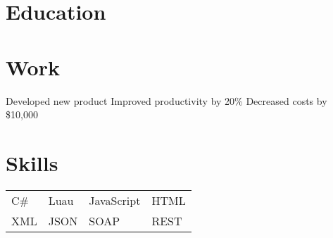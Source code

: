 \documentclass{my_cv}
\begin{document}

\section{Education}

\section{Work}
\workitems
{Developed new product}
{Improved productivity by 20\%}
{Decreased costs by \$10,000}

\section{Skills}
\begin{tabular}{l l l l}
C\# & Luau & JavaScript & HTML \\
XML & JSON & SOAP & REST
\end{tabular}
\end{document}
